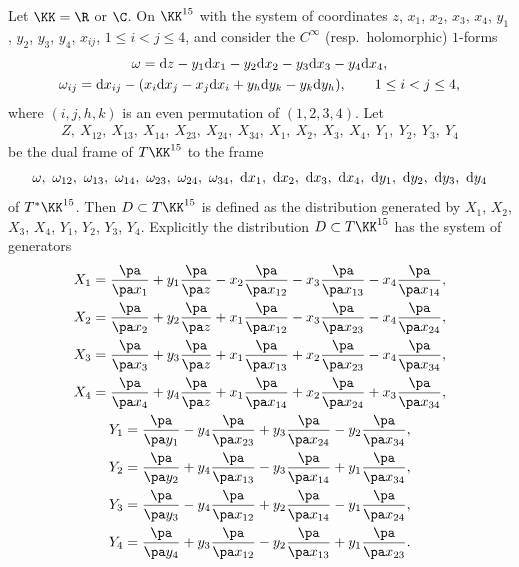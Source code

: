 Let $\KK = \R$ or $\C$.
On $\KK^{15}$ with the system of coordinates
$z$, $x_1$, $x_2$, $x_3$, $x_4$, $y_1$, $y_2$, $y_3$, $y_4$, $x_{ij}$, $1 \leq i < j \leq 4$, and consider the $C^\infty$ (resp.\ holomorphic) $1$-forms
\begin{gather*}
\omega = {\rm d}z - y_1{\rm d}x_1 - y_2{\rm d}x_2 - y_3{\rm d}x_3 - y_4{\rm d}x_4,
\\
\omega_{ij} =
{\rm d}x_{ij} - (x_i{\rm d}x_j - x_j{\rm d}x_i + y_h{\rm d}y_k - y_k{\rm d}y_h), \qquad 1 \leq i < j \leq 4,
\end{gather*}
where $(i, j, h, k)$ is an even permutation of $(1, 2, 3, 4)$.
Let
\begin{gather*}
Z,\ X_{12},\ X_{13},\ X_{14},\ X_{23},\ X_{24},\ X_{34},\ X_1,\ X_2,\ X_3,\ X_4,\ Y_1,\ Y_2,\ Y_3,\ Y_4
\end{gather*}
be the dual frame of $T\KK^{15}$ to the frame
\[
\omega,\ \omega_{12},\ \omega_{13},\ \omega_{14},\ \omega_{23},\ \omega_{24},\ \omega_{34},\
{\rm d}x_1,\ {\rm d}x_2,\ {\rm d}x_3,\ {\rm d}x_4,\ {\rm d}y_1,\ {\rm d}y_2,\ {\rm d}y_3,\ {\rm d}y_4
\]
of $T^*\KK^{15}$.
Then $D \subset T\KK^{15}$ is defined as the distribution generated by $X_1$, $X_2$, $X_3$, $X_4$, $Y_1$, $Y_2$, $Y_3$, $Y_4$.
Explicitly the distribution $D \subset T\KK^{15}$ has the system of generators
\begin{gather*}
X_1 = \frac{\pa}{\pa x_1} + y_1\frac{\pa}{\pa z} - x_2\frac{\pa}{\pa x_{12}} - x_3\frac{\pa}{\pa x_{13}} -
x_4\frac{\pa}{\pa x_{14}},
\\
X_2 = \frac{\pa}{\pa x_2} + y_2\frac{\pa}{\pa z} + x_1\frac{\pa}{\pa x_{12}} - x_3\frac{\pa}{\pa x_{23}} -
x_4\frac{\pa}{\pa x_{24}},
\\
X_3 = \frac{\pa}{\pa x_3} + y_3\frac{\pa}{\pa z} + x_1\frac{\pa}{\pa x_{13}} + x_2\frac{\pa}{\pa x_{23}} -
x_4\frac{\pa}{\pa x_{34}},
\\
X_4 = \frac{\pa}{\pa x_4} + y_4\frac{\pa}{\pa z} + x_1\frac{\pa}{\pa x_{14}} + x_2\frac{\pa}{\pa x_{24}} +
x_3\frac{\pa}{\pa x_{34}},
\\
Y_1 = \frac{\pa}{\pa y_1} - y_4\frac{\pa}{\pa x_{23}} + y_3\frac{\pa}{\pa x_{24}} - y_2\frac{\pa}{\pa x_{34}},
\\
Y_2 = \frac{\pa}{\pa y_2} + y_4\frac{\pa}{\pa x_{13}} - y_3\frac{\pa}{\pa x_{14}} + y_1\frac{\pa}{\pa x_{34}},
\\
Y_3 = \frac{\pa}{\pa y_3} - y_4\frac{\pa}{\pa x_{12}} + y_2\frac{\pa}{\pa x_{14}} - y_1\frac{\pa}{\pa x_{24}},
\\
Y_4 = \frac{\pa}{\pa y_4} + y_3\frac{\pa}{\pa x_{12}} - y_2\frac{\pa}{\pa x_{13}} + y_1\frac{\pa}{\pa x_{23}}.
\end{gather*}

